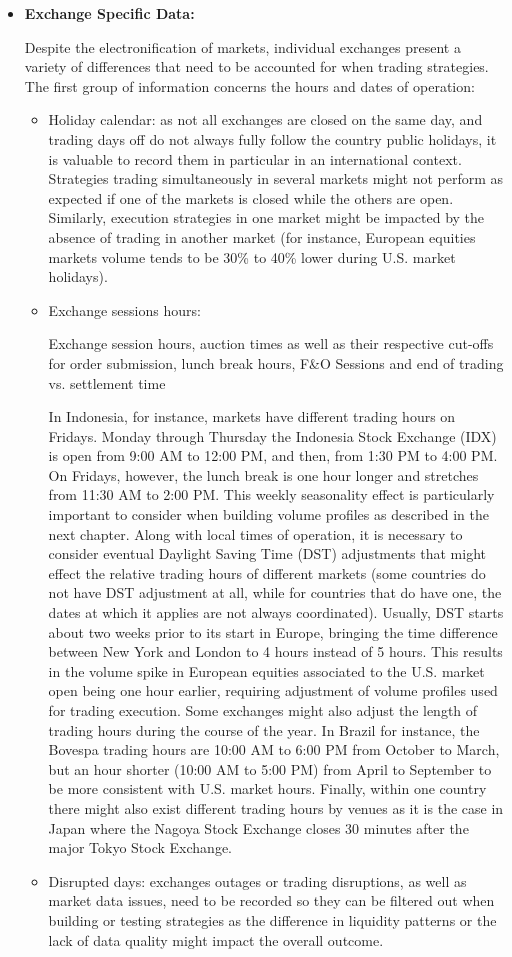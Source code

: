 \begin{itemize}
\item \textbf{Exchange Specific Data:}  

Despite the electronification of markets, individual exchanges present a variety of differences that need to be accounted for when trading strategies. The first group of information concerns the hours and dates of operation:

\begin{itemize}
\item Holiday calendar: as not all exchanges are closed on the same day, and trading days off do not always fully follow the country public holidays, it is valuable to record them in particular in an international context. Strategies trading simultaneously in several markets might not perform as expected if one of the markets is closed while the others are open. Similarly, execution strategies in one market might be impacted by the absence of trading in another market (for instance, European equities markets volume tends to be 30\% to 40\% lower during U.S. market holidays).
\item Exchange sessions hours: 

Exchange session hours, auction times as well as their respective cut-offs for order submission, lunch break hours, 
F\&O Sessions and end of trading vs. settlement time

In Indonesia, for instance, markets have different trading hours on Fridays. Monday through Thursday the Indonesia Stock Exchange (IDX) is open from 9:00 AM to 12:00 PM, and then, from 1:30 PM to 4:00 PM. On Fridays, however, the lunch break is one hour longer and stretches from 11:30 AM to 2:00 PM. This weekly seasonality effect is particularly important to consider when building volume profiles as described in the next chapter.
Along with local times of operation, it is necessary to consider eventual Daylight Saving Time (DST) adjustments that might effect the relative trading hours of different markets (some countries do not have DST adjustment at all, while for countries that do have one, the dates at which it applies are not always coordinated). Usually, DST starts about two weeks prior to its start in Europe, bringing the time difference between New York and London to 4 hours instead of 5 hours. This results in the volume spike in European equities associated to the U.S. market open being one hour earlier, requiring adjustment of volume profiles used for trading execution.
Some exchanges might also adjust the length of trading hours during the course of the year. In Brazil for instance, the Bovespa trading hours are 10:00 AM to 6:00 PM from October to March, but an hour shorter (10:00 AM to 5:00 PM) from April to September to be more consistent with U.S. market hours.
Finally, within one country there might also exist different trading hours by venues as it is the case in Japan where the Nagoya Stock Exchange closes 30 minutes after the major Tokyo Stock Exchange.
\item Disrupted days: exchanges outages or trading disruptions, as well as market data issues, need to be recorded so they can be filtered out when building or testing strategies as the difference in liquidity patterns or the lack of data quality might impact the overall outcome.


\end{itemize}
\end{itemize}
